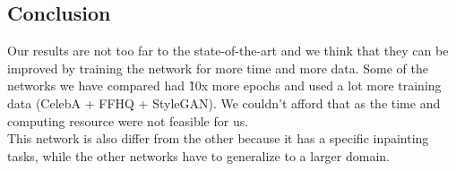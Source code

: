 \documentclass[10pt,twocolumn,letterpaper]{article}
\begin{document}
\subsection{Conclusion}
Our results are not too far to the state-of-the-art and we think that they can be
improved by training the network for more time and more data. Some of the
networks we have compared had \~10x more epochs and used a lot more training data (CelebA + FFHQ + StyleGAN).
We couldn't afford that as the time and computing resource were not feasible for
us.\\ This network is also differ from the other because it has a specific inpainting
tasks, while the other networks have to generalize to a larger domain.


{\small


}
\end{document}
